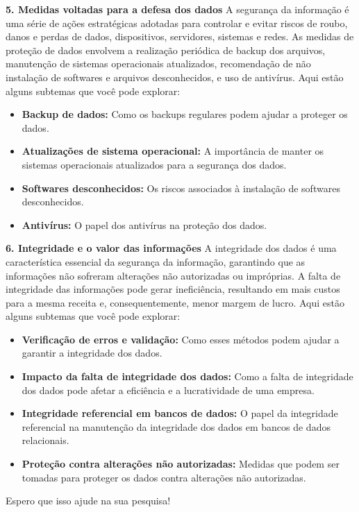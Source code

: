 \documentclass[10pt,conference,twocolumn]{article}
\begin{document}
\textbf{5. Medidas voltadas para a defesa dos dados} A segurança da informação é uma série de ações estratégicas adotadas para controlar e evitar riscos de roubo, danos e perdas de dados, dispositivos, servidores, sistemas e redes. As medidas de proteção de dados envolvem a realização periódica de backup dos arquivos, manutenção de sistemas operacionais atualizados, recomendação de não instalação de softwares e arquivos desconhecidos, e uso de antivírus. Aqui estão alguns subtemas que você pode explorar:
\begin{itemize}
    \item \textbf{Backup de dados:} Como os backups regulares podem ajudar a proteger os dados.

    \item \textbf{Atualizações de sistema operacional:} A importância de manter os sistemas operacionais atualizados para a segurança dos dados.

    \item \textbf{Softwares desconhecidos:} Os riscos associados à instalação de softwares desconhecidos.

    \item \textbf{Antivírus:} O papel dos antivírus na proteção dos dados.
\end{itemize}

\textbf{6. Integridade e o valor das informações} A integridade dos dados é uma característica essencial da segurança da informação, garantindo que as informações não sofreram alterações não autorizadas ou impróprias. A falta de integridade das informações pode gerar ineficiência, resultando em mais custos para a mesma receita e, consequentemente, menor margem de lucro. Aqui estão alguns subtemas que você pode explorar:
\begin{itemize}
    \item \textbf{Verificação de erros e validação:} Como esses métodos podem ajudar a garantir a integridade dos dados.

    \item \textbf{Impacto da falta de integridade dos dados:} Como a falta de integridade dos dados pode afetar a eficiência e a lucratividade de uma empresa.

    \item \textbf{Integridade referencial em bancos de dados:} O papel da integridade referencial na manutenção da integridade dos dados em bancos de dados relacionais.

    \item \textbf{Proteção contra alterações não autorizadas:} Medidas que podem ser tomadas para proteger os dados contra alterações não autorizadas.
\end{itemize}
Espero que isso ajude na sua pesquisa!
\end{document}
